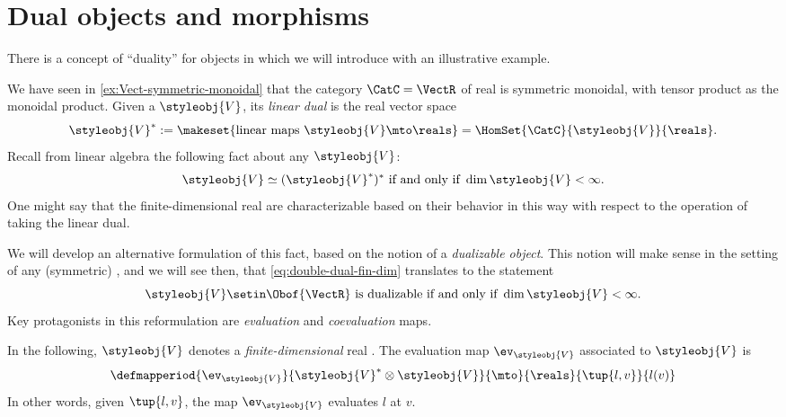 
\section{Dual objects and morphisms}
\label{sec:dual-objects}
There is a concept of ``duality'' for objects in  which we will introduce with an illustrative example.

We have seen in \cref{ex:Vect-symmetric-monoidal} that the category $\CatC = \VectR$ of real  is symmetric monoidal, with tensor product as the monoidal product.
Given a  $\styleobj{V} $, its \emph{linear dual} is the real vector space
\begin{equation}
    \label{eq:lin-dual-vecsp}
    \styleobj{V} ^{*} := \makeset{ \text{linear maps } \styleobj{V} \mto \reals } = \HomSet{\CatC}{\styleobj{V}}{ \reals}.
\end{equation}
%
Recall from linear algebra the following fact about any  $\styleobj{V} $:
%
\begin{equation}
    \label{eq:double-dual-fin-dim}
    \styleobj{V} \simeq (\styleobj{V} ^{*})^* \text{ if and only if } \dim \styleobj{V} < \infty.
\end{equation}
%
One might say that the finite-dimensional real  are characterizable based on their behavior in this way with respect to the operation of taking the linear dual.

We will develop an alternative formulation of this fact, based on the notion of a \emph{dualizable object}.
This notion will make sense in the setting of any (symmetric) , and we will see then, that \cref{eq:double-dual-fin-dim} translates to the statement
\begin{equation}
    \label{eq:dualizable-fin-dim}
    \styleobj{V} \setin \Obof{\VectR} \text{ is dualizable if and only if } \dim \styleobj{V} < \infty.
\end{equation}
%
Key protagonists in this reformulation are \emph{evaluation} and \emph{coevaluation} maps.

In the following, $\styleobj{V} $ denotes a \emph{finite-dimensional} real .
The evaluation map $\ev_\styleobj{V} $ associated to $\styleobj{V} $ is
\begin{equation}
    \label{eq:evaluation-vecsp}
    \defmapperiod{
        \ev_\styleobj{V}
    }{
        \styleobj{V}^* \otimes \styleobj{V}
    }{
        \mto
    }{
        \reals
    }{
        \tup{l, v}
    }{
        l(v)
    }
\end{equation}
In other words, given $\tup{l, v}$, the map $\ev_\styleobj{V} $ evaluates $l$ at $v$.

